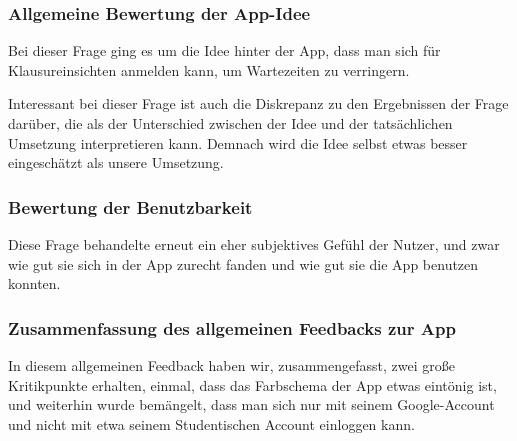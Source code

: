         \subsubsection{Allgemeine Bewertung der App-Idee}

            Bei dieser Frage ging es um die Idee hinter der App, dass man sich für Klausureinsichten anmelden kann, um Wartezeiten zu verringern.

            Interessant bei dieser Frage ist auch die Diskrepanz zu den Ergebnissen der Frage darüber, die als der Unterschied zwischen der Idee und der tatsächlichen Umsetzung interpretieren kann. Demnach wird die Idee selbst etwas besser eingeschätzt als unsere Umsetzung.

            \begin{bchart} [min = 0, max = 10, step = 2]
                \bigskip
                \bigskip
                \bigskip
                \bigskip
            \end{bchart}

        \subsubsection{Bewertung der Benutzbarkeit}

            Diese Frage behandelte erneut ein eher subjektives Gefühl der Nutzer, und zwar wie gut sie sich in der App zurecht fanden und wie gut sie die App benutzen konnten.

            \begin{bchart} [min = 0, max = 10, step = 2]
                \bigskip
                \bigskip
                \bigskip
                \bigskip
            \end{bchart}

        \newpage

        \subsubsection{Zusammenfassung des allgemeinen Feedbacks zur App}

            In diesem allgemeinen Feedback haben wir, zusammengefasst, zwei große Kritikpunkte erhalten, einmal, dass das Farbschema der App etwas eintönig ist, und weiterhin wurde bemängelt, dass man sich nur mit seinem Google-Account und nicht mit etwa seinem Studentischen Account einloggen kann.

